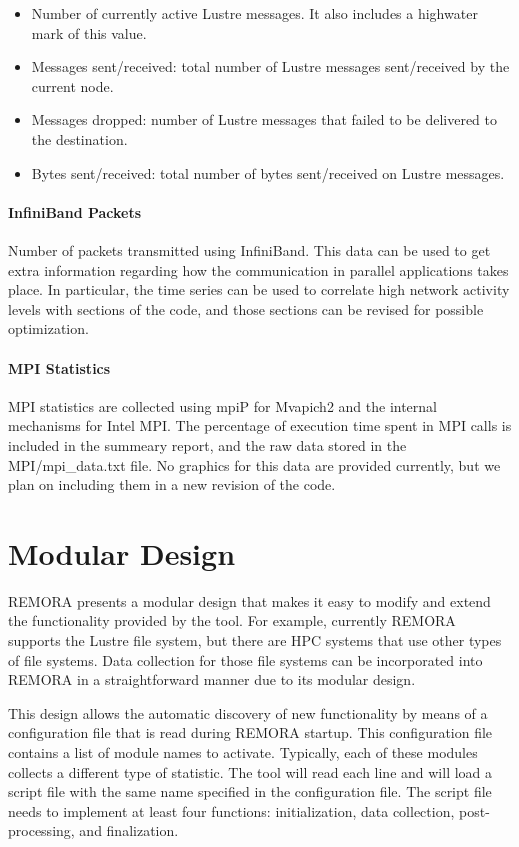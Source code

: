 \documentclass[10pt,a4paper]{report}
\begin{document}
\begin{itemize}
\item Number of currently active Lustre messages. It also includes a highwater mark of this value.
\item Messages sent/received: total number of Lustre messages sent/received by the current node.
\item Messages dropped: number of Lustre messages that failed to be delivered to the destination.
\item Bytes sent/received: total number of bytes sent/received on Lustre messages.
\end{itemize}


\paragraph{InfiniBand Packets}
Number of packets transmitted using InfiniBand. This data can be used to get extra information regarding how the communication in parallel applications takes place. In particular, the time series can be used to correlate high network activity levels with sections of the code, and those sections can be revised for possible optimization.

\paragraph{MPI Statistics}
MPI statistics are collected using mpiP for Mvapich2 and the internal mechanisms for Intel MPI. The percentage of execution time spent in MPI calls is included in the summeary report, and the raw data stored in the MPI/mpi_data.txt file. No graphics for this data are provided currently, but we plan on including them in a new revision of the code.

\FloatBarrier
\section{Modular Design}
REMORA presents a modular design that makes it easy to modify and extend the functionality 
provided by the tool. For example, currently REMORA supports
the Lustre file system, but there are HPC systems that use other types of file systems.
Data collection for those file systems can be incorporated into REMORA in a straightforward
manner due to its modular design.

This design allows the automatic discovery of new functionality by means of a configuration
file that is read during REMORA startup. This configuration file contains
a list of module names to activate. Typically, each of these modules collects a 
different type of statistic. The tool will read each line and will load a
script file with the same name specified in the configuration file. The script file needs
to implement at least four functions: initialization, data collection, post-processing, and 
finalization.
\end{document}
